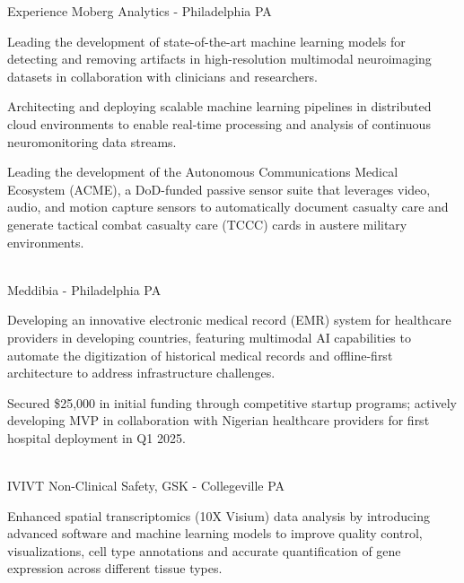 \documentclass[]{resume-knyte}
\begin{document}
\begin{topic}{Experience}
    {Moberg Analytics - Philadelphia PA}
    {
        \item Leading the development of state-of-the-art machine learning models for detecting and removing artifacts in high-resolution multimodal neuroimaging datasets in collaboration with clinicians and researchers.
        \vspace{-5pt}

        \item Architecting and deploying scalable machine learning pipelines in distributed cloud environments to enable real-time processing and analysis of continuous neuromonitoring data streams.
        \vspace{-5pt}

        \item Leading the development of the Autonomous Communications Medical Ecosystem (ACME), a DoD-funded passive sensor suite that leverages video, audio, and motion capture sensors to automatically document casualty care and generate tactical combat casualty care (TCCC) cards in austere military environments.
        \vspace{-5pt}
    }\\

    {Meddibia - Philadelphia PA}
    {
        \item Developing an innovative electronic medical record (EMR) system for healthcare providers in developing countries, featuring multimodal AI capabilities to automate the digitization of historical medical records and offline-first architecture to address infrastructure challenges.
        \vspace{-5pt}

        \item Secured \$25,000 in initial funding through competitive startup programs; actively developing MVP in collaboration with Nigerian healthcare providers for first hospital deployment in Q1 2025.
        \vspace{-5pt}
    }\\

    {IVIVT Non-Clinical Safety, GSK - Collegeville PA}
    {
        \item Enhanced spatial transcriptomics (10X Visium) data analysis by introducing advanced software and machine learning models to improve quality control, visualizations, cell type annotations and accurate quantification of gene expression across different tissue types.
        \vspace{-5pt}

}
\end{topic}
\end{document}

